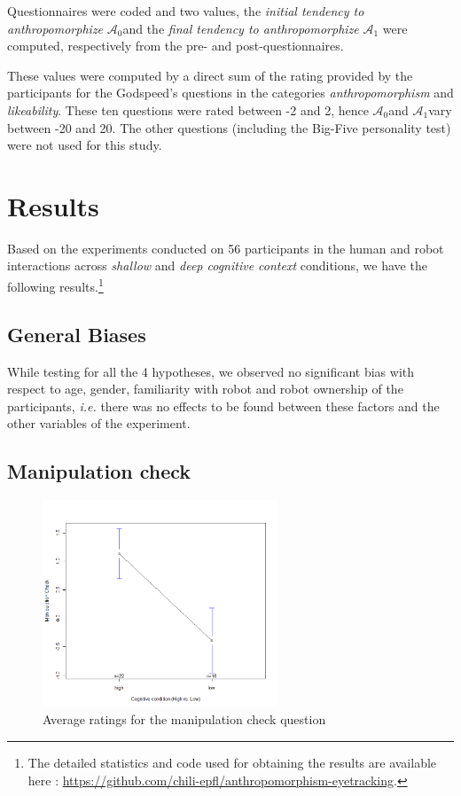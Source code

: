 \documentclass[lettersize, noapacite, twoside, HRI]{apa_HRI}
\newcommand{\ie}{\textit{i.e.}\xspace}
\newcommand{\anti}{{$\mathcal{A}_0$\xspace}}
\newcommand{\antf}{{$\mathcal{A}_1$\xspace}}
\begin{document}
Questionnaires were coded and two values, the \emph{initial tendency to
anthropomorphize} \anti and the \emph{final tendency to anthropomorphize} \antf
were computed, respectively from the pre- and post-questionnaires.

These values were computed by a direct sum of the rating provided by the
participants for the Godspeed's questions in the categories
\emph{anthropomorphism} and \emph{likeability}. These ten questions were rated
between -2 and 2, hence \anti and \antf vary between -20 and 20.  The other
questions (including the Big-Five personality test) were not used for this
study.

\section{Results}

Based on the experiments conducted on 56 participants in the human and robot
interactions across \emph{shallow} and \emph{deep cognitive context} conditions,
we have the following results.\footnote{The detailed statistics and code used
    for obtaining the results are available here :
\url{https://github.com/chili-epfl/anthropomorphism-eyetracking}.}

\subsection{General Biases}

While testing for all the 4 hypotheses, we observed no significant bias with
respect to age, gender, familiarity with robot and robot ownership
of the participants, \ie there was no effects to be found between these factors
and the other variables of the experiment.

\subsection{Manipulation check}

\begin{figure}
    \centering
    \includegraphics[width=7cm]{ManipulationCheck}
    \caption{Average ratings for the manipulation check question}
    \label{fig:ManipulationCheck}
\end{figure}
\end{document}
